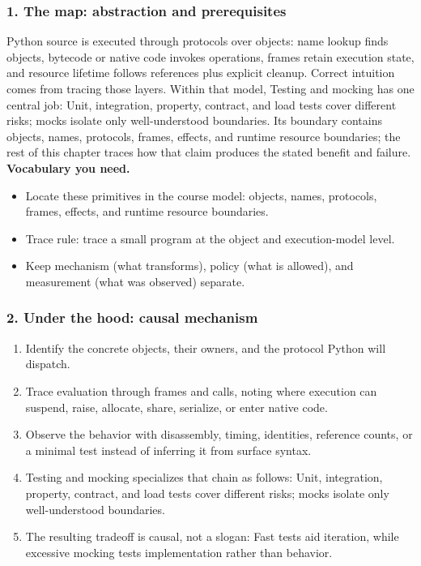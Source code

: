 \subsubsection*{1. The map: abstraction and prerequisites}
Python source is executed through protocols over objects: name lookup finds objects, bytecode or native code invokes operations, frames retain execution state, and resource lifetime follows references plus explicit cleanup. Correct intuition comes from tracing those layers.
Within that model, Testing and mocking has one central job: Unit, integration, property, contract, and load tests cover different risks; mocks isolate only well-understood boundaries. Its boundary contains objects, names, protocols, frames, effects, and runtime resource boundaries; the rest of this chapter traces how that claim produces the stated benefit and failure.
\textbf{Vocabulary you need.}\begin{itemize}
\item Locate these primitives in the course model: objects, names, protocols, frames, effects, and runtime resource boundaries.
\item Trace rule: trace a small program at the object and execution-model level.
\item Keep mechanism (what transforms), policy (what is allowed), and measurement (what was observed) separate.
\end{itemize}
\subsubsection*{2. Under the hood: causal mechanism}\begin{enumerate}
\item Identify the concrete objects, their owners, and the protocol Python will dispatch.
\item Trace evaluation through frames and calls, noting where execution can suspend, raise, allocate, share, serialize, or enter native code.
\item Observe the behavior with disassembly, timing, identities, reference counts, or a minimal test instead of inferring it from surface syntax.
\item Testing and mocking specializes that chain as follows: Unit, integration, property, contract, and load tests cover different risks; mocks isolate only well-understood boundaries.
\item The resulting tradeoff is causal, not a slogan: Fast tests aid iteration, while excessive mocking tests implementation rather than behavior.
\end{enumerate}
